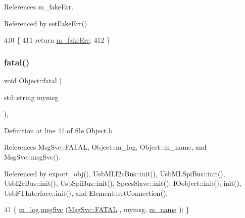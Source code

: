References m\+\_\+fake\+Err.



Referenced by set\+Fake\+Err().


\begin{DoxyCode}
410                           \{
411     \textcolor{keywordflow}{return} \hyperlink{classUsbFTMLInterface_a35c84586c9aae7555b56481d636338e8}{m\_fakeErr};
412   \}
\end{DoxyCode}
\mbox{\label{classObject_aad5a16aac7516ce65bd5ec02ab07fc80}} 
\subsubsection{\texorpdfstring{fatal()}{fatal()}\hspace{0.1cm}{\footnotesize\ttfamily [1/2]}}
{\footnotesize\ttfamily void Object\+::fatal (\begin{DoxyParamCaption}\item[{std\+::string}]{mymsg }\end{DoxyParamCaption})\hspace{0.3cm}{\ttfamily [inline]}, {\ttfamily [inherited]}}



Definition at line 41 of file Object.\+h.



References Msg\+Svc\+::\+F\+A\+T\+AL, Object\+::m\+\_\+log, Object\+::m\+\_\+name, and Msg\+Svc\+::msg\+Svc().



Referenced by export\+\_\+obj(), Usb\+M\+L\+I2c\+Bus\+::init(), Usb\+M\+L\+Spi\+Bus\+::init(), Usb\+I2c\+Bus\+::init(), Usb\+Spi\+Bus\+::init(), Specs\+Slave\+::init(), I\+Oobject\+::init(), init(), Usb\+F\+T\+Interface\+::init(), and Element\+::set\+Connection().


\begin{DoxyCode}
41 \{ \hyperlink{classObject_a0d269813dd7ac1f24bc143031e2963f2}{m\_log}.\hyperlink{classMsgSvc_ad25f18047920cc59a314e5098259711c}{msgSvc} (\hyperlink{classMsgSvc_ae671eb7301996cd049d2da8a65925926a59c73cb29edfc9cdf35845e2b1301363}{MsgSvc::FATAL}   , mymsg, \hyperlink{classObject_a8b83c95c705d2c3ba0d081fe1710f48d}{m\_name} ); \}
\end{DoxyCode}
\mbox{\label{classObject_ae62acd3d09f716220f75f252dc38bc9a}} 
